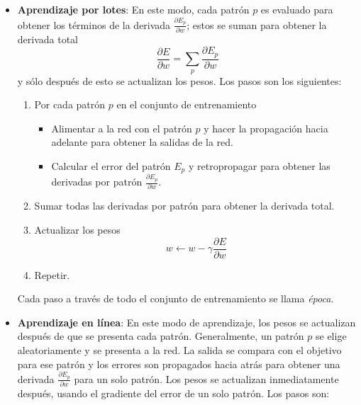\begin{itemize}
    \item \textbf{Aprendizaje por lotes}: En este modo, cada patrón $p$ es evaluado para obtener los términos de la derivada $\frac{\partial E_p}{\partial w}$; estos se suman para obtener la derivada total
    \[
      \frac{\partial E}{\partial w}  = \sum_p \frac{\partial E_p}{\partial w} 
    \]
    y sólo después de esto se actualizan los pesos. Los pasos son los siguientes:
    
    \begin{enumerate}
        \item Por cada patrón $p$ en el conjunto de entrenamiento
            \begin{itemize}
                \item Alimentar a la red con el patrón $p$ y hacer la propagación hacia adelante para obtener la salidas de la red.
                \item Calcular el error del patrón $E_p$ y retropropagar para obtener 
                las derivadas por patrón $\frac{\partial E_p}{\partial w}$.
            \end{itemize}
        \item Sumar todas las derivadas por patrón para obtener la derivada total.
        \item Actualizar los pesos
        \[
            w \leftarrow w - \gamma \frac{\partial E}{\partial w}
        \]
        \item Repetir.
    \end{enumerate}
    
    Cada paso a través de todo el conjunto de entrenamiento se llama \textit{época}.
    
    \item \textbf{Aprendizaje en línea}: En este modo de aprendizaje, los pesos
    se actualizan después de que se presenta cada patrón. Generalmente, un patrón $p$ se
    elige aleatoriamente y se presenta a la red. La salida se compara con el objetivo
    para ese patrón y los errores son propagados hacia atrás para obtener una
    derivada $\frac{\partial E_p}{\partial w}$  para un solo patrón. Los pesos se actualizan
    inmediatamente después, usando el gradiente del error de un solo patrón.
    Los pasos son:
    

\end{itemize}
